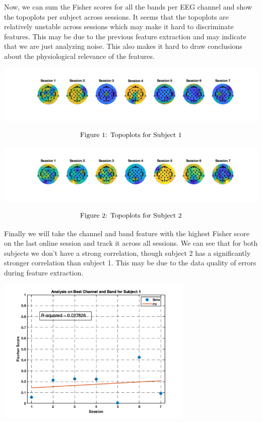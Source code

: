 \documentclass[12pt]{article}
\begin{document}
Now, we can sum the Fisher scores for all the bands per EEG channel and show the topoplots per subject across sessions. It seems that the topoplots are relatively unstable across sessions which may make it hard to discriminate features. This may be due to the previous feature extraction and may indicate that we are just analyzing noise. This also makes it hard to draw conclusions about the physiological relevance of the features.

\begin{center}
    \includegraphics[width=\textwidth]{subj1_topo.png}
\end{center}
$$\textnormal{Figure 1: Topoplots for Subject 1}$$

\begin{center}
    \includegraphics[width=\textwidth]{subj2_topo.png}
\end{center}
$$\textnormal{Figure 2: Topoplots for Subject 2}$$

Finally we will take the channel and band feature with the highest Fisher score on the last online session and track it across all sessions. We can see that for both subjects we don't have a strong correlation, though subject 2 has a significantly stronger correlation than subject 1. This may be due to the data quality of errors during feature extraction.

\begin{center}
    \includegraphics[width=0.7\textwidth]{2_4.png}
\end{center}
\end{document}
